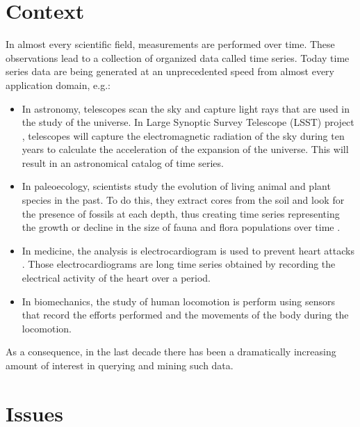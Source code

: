 
\section*{Context}

In almost every scientific field, measurements are performed over time. These observations lead to a collection
of organized data called time series. Today time series data are being generated at an unprecedented
speed from almost every application domain, e.g.: 

\begin{itemize}
\item In astronomy, telescopes scan the sky and capture light rays that are used in the study of the universe. In Large Synoptic Survey Telescope (LSST) project \cite{lsst}, telescopes will capture the electromagnetic radiation of the sky during ten years to calculate the acceleration of the expansion of the universe. This will result in an astronomical catalog of time series.
\item In paleoecology, scientists study the evolution of living animal and plant species in the past. To do this, they extract cores from the soil and look for the presence of fossils at each depth, thus creating time series representing the growth or decline in the size of fauna and flora populations over time \cite{lonlacfouille}. 
\item In medicine, the analysis is electrocardiogram is used to prevent heart attacks \cite{ding2011key}. Those electrocardiograms are long time series obtained by recording the electrical activity of the heart over a period.  
\item In biomechanics, the study of human locomotion is perform using sensors that record the efforts performed and the movements of the body during the locomotion.
\end{itemize}

As a consequence, in the last decade there has been a dramatically increasing amount of interest in querying and mining such data.

\section*{Issues}



